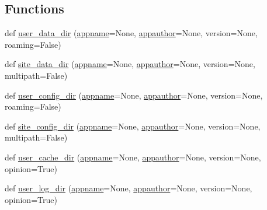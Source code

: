 \subsection*{Functions}
\begin{DoxyCompactItemize}
\item 
def \hyperlink{namespacepkg__resources_1_1__vendor_1_1appdirs_a3b03c46f6524b886b726517c7f76dad4}{user\+\_\+data\+\_\+dir} (\hyperlink{namespacepkg__resources_1_1__vendor_1_1appdirs_a28612b51282dfcbcae04f6f4e4891d64}{appname}=None, \hyperlink{namespacepkg__resources_1_1__vendor_1_1appdirs_a59d40ca8fd52cbf79588efb87fbc4f1e}{appauthor}=None, version=None, roaming=False)
\item 
def \hyperlink{namespacepkg__resources_1_1__vendor_1_1appdirs_acb43152414eb8ae400a05e490b103f31}{site\+\_\+data\+\_\+dir} (\hyperlink{namespacepkg__resources_1_1__vendor_1_1appdirs_a28612b51282dfcbcae04f6f4e4891d64}{appname}=None, \hyperlink{namespacepkg__resources_1_1__vendor_1_1appdirs_a59d40ca8fd52cbf79588efb87fbc4f1e}{appauthor}=None, version=None, multipath=False)
\item 
def \hyperlink{namespacepkg__resources_1_1__vendor_1_1appdirs_a30f0cf6e4ca4ce5a3b7d3c58e5049f05}{user\+\_\+config\+\_\+dir} (\hyperlink{namespacepkg__resources_1_1__vendor_1_1appdirs_a28612b51282dfcbcae04f6f4e4891d64}{appname}=None, \hyperlink{namespacepkg__resources_1_1__vendor_1_1appdirs_a59d40ca8fd52cbf79588efb87fbc4f1e}{appauthor}=None, version=None, roaming=False)
\item 
def \hyperlink{namespacepkg__resources_1_1__vendor_1_1appdirs_a99cc70bd4895bf161b501b38f35bde38}{site\+\_\+config\+\_\+dir} (\hyperlink{namespacepkg__resources_1_1__vendor_1_1appdirs_a28612b51282dfcbcae04f6f4e4891d64}{appname}=None, \hyperlink{namespacepkg__resources_1_1__vendor_1_1appdirs_a59d40ca8fd52cbf79588efb87fbc4f1e}{appauthor}=None, version=None, multipath=False)
\item 
def \hyperlink{namespacepkg__resources_1_1__vendor_1_1appdirs_a4b66dc639f1ae3dbbd1598ad39196a18}{user\+\_\+cache\+\_\+dir} (\hyperlink{namespacepkg__resources_1_1__vendor_1_1appdirs_a28612b51282dfcbcae04f6f4e4891d64}{appname}=None, \hyperlink{namespacepkg__resources_1_1__vendor_1_1appdirs_a59d40ca8fd52cbf79588efb87fbc4f1e}{appauthor}=None, version=None, opinion=True)
\item 
def \hyperlink{namespacepkg__resources_1_1__vendor_1_1appdirs_ae686d8bb6561d9b02bfa56698f8a390f}{user\+\_\+log\+\_\+dir} (\hyperlink{namespacepkg__resources_1_1__vendor_1_1appdirs_a28612b51282dfcbcae04f6f4e4891d64}{appname}=None, \hyperlink{namespacepkg__resources_1_1__vendor_1_1appdirs_a59d40ca8fd52cbf79588efb87fbc4f1e}{appauthor}=None, version=None, opinion=True)
\end{DoxyCompactItemize}
